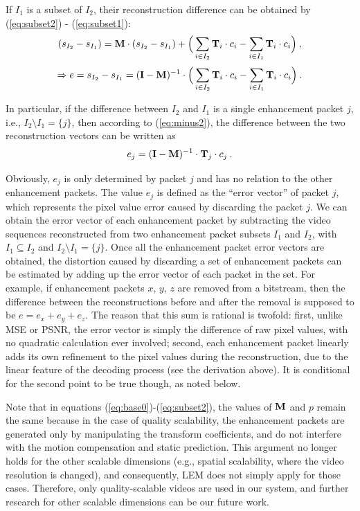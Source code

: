 \documentclass[journal]{IEEEtran}
\begin{document}
If $I_1$ is a subset of $I_2$, their reconstruction difference can be obtained by (\ref{eq:subset2}) - (\ref{eq:subset1}):
\begin{equation}
\label{eq:minus1}
(s_{I_2} - s_{I_1}) = {\rm\bf M} \cdot (s_{I_2} - s_{I_1}) + \Big( \sum_{i \in I_2}{\rm\bf T}_i \cdot c_i - \sum_{i \in I_1}{\rm\bf T}_i \cdot c_i \Big) \: ,
\end{equation}
\begin{equation}
\label{eq:minus2}
\Rightarrow e = s_{I_2} - s_{I_1} = ({\rm\bf I - M})^{-1} \cdot \Big( \sum_{i \in I_2}{\rm\bf T}_i \cdot c_i - \sum_{i \in I_1}{\rm\bf T}_i \cdot c_i \Big) \: .
\end{equation}
	
In particular, if the difference between $I_2$ and $I_1$ is a single enhancement packet $j$, i.e., $I_2 \setminus I_1 = \{j\}$, then according to (\ref{eq:minus2}), the difference between the two reconstruction vectors can be written as
\begin{equation}
\label{eq:error_j}
e_j = ({\rm\bf I - M})^{-1} \cdot {\rm\bf T}_j \cdot c_j \: .
\end{equation}
	
Obviously, $e_j$ is only determined by packet $j$ and has no relation to the other enhancement packets. The value $e_j$ is defined as the ``error vector'' of packet $j$, which represents the pixel value error caused by discarding the packet $j$. We can obtain the error vector of each enhancement packet by subtracting the video sequences reconstructed from two enhancement packet subsets $I_1$ and $I_2$, with $I_1 \subseteq I_2$ and $I_2 \setminus I_1 =\{j\} $. Once all the enhancement packet error vectors are obtained, the distortion caused by discarding a set of enhancement packets can be estimated by adding up the error vector of each packet in the set. For example, if enhancement packets $x$, $y$, $z$ are removed from a bitstream, then the difference between the reconstructions before and after the removal is supposed to be $e = e_x + e_y + e_z$. The reason that this sum is rational is twofold: first, unlike MSE or PSNR, the error vector is simply the difference of raw pixel values, with no quadratic calculation ever involved; second, each enhancement packet linearly adds its own refinement to the pixel values during the reconstruction, due to the linear feature of the decoding process (see the derivation above). It is conditional for the second point to be true though, as noted below.

Note that in equations (\ref{eq:base0})-(\ref{eq:subset2}), the values of ${\rm\bf M}$ and $p$ remain the same because in the case of quality scalability, the enhancement packets are generated only by manipulating the transform coefficients, and do not interfere with the motion compensation and static prediction. This argument no longer holds for the other scalable dimensions (e.g., spatial scalability, where the video resolution is changed), and consequently, LEM does not simply apply for those cases. Therefore, only quality-scalable videos are used in our system, and further research for other scalable dimensions can be our future work.
\end{document}
